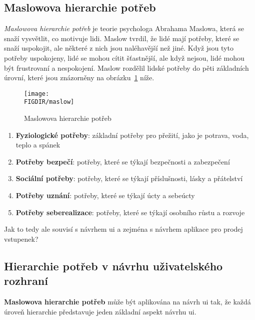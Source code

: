 \subsection{Maslowova hierarchie potřeb}
\label{subsec:navrh-psychologie-maslow}

\textit{Maslowova hierarchie potřeb} je teorie psychologa Abrahama Maslowa, která se snaží vysvětlit, co motivuje lidi.
Maslow tvrdil, že lidé mají potřeby, které se snaží uspokojit, ale některé z nich jsou naléhavější než jiné.
Když jsou tyto potřeby uspokojeny, lidé se mohou cítit šťastnější, ale když nejsou, lidé mohou být frustrovaní a nespokojení.\cite{maslow}
Maslow rozdělil lidské potřeby do pěti základních úrovní, které jsou znázorněny na obrázku~\ref{fig:maslow} níže.

\begin{figure}[H]
    \centering
    \texttt{[image: \\FIGDIR/maslow]}
    \caption{Maslowova hierarchie potřeb\cite{wiki_potreby}}
    \label{fig:maslow}
\end{figure}

\begin{enumerate}
    \item \textbf{Fyziologické potřeby}: základní potřeby pro přežití, jako je potrava, voda, teplo a spánek
    \item \textbf{Potřeby bezpečí}: potřeby, které se týkají bezpečnosti a zabezpečení
    \item \textbf{Sociální potřeby}: potřeby, které se týkají příslušnosti, lásky a přátelství
    \item \textbf{Potřeby uznání}: potřeby, které se týkají úcty a sebeúcty
    \item \textbf{Potřeby seberealizace}: potřeby, které se týkají osobního růstu a rozvoje
\end{enumerate}

Jak to tedy ale souvisí s návrhem \ac{ui} a zejména s návrhem aplikace pro prodej vstupenek?

\subsection{Hierarchie potřeb v návrhu uživatelského rozhraní}
\label{subsec:navrh-psychologie-hierarchie}
\textbf{Maslowova hierarchie potřeb} může být aplikována na návrh \ac{ui} tak, že každá úroveň hierarchie představuje jeden základní aspekt návrhu \ac{ui}.

